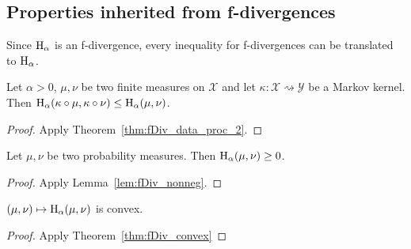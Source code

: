 \subsection{Properties inherited from f-divergences}

Since $\operatorname{H}_\alpha$ is an f-divergence, every inequality for f-divergences can be translated to $\operatorname{H}_\alpha$.

\begin{theorem}
  \label{thm:hellingerAlpha_data_proc}
  \leanok
  Let $\alpha > 0$, $\mu, \nu$ be two finite measures on $\mathcal X$ and let $\kappa : \mathcal X \rightsquigarrow \mathcal Y$ be a Markov kernel.
  Then $\operatorname{H}_\alpha(\kappa \circ \mu, \kappa \circ \nu) \le \operatorname{H}_\alpha(\mu, \nu)$.
\end{theorem}

\begin{proof} \leanok
{}
Apply Theorem~\ref{thm:fDiv_data_proc_2}.
\end{proof}

\begin{lemma}
  \label{lem:hellingerAlpha_nonneg}
  \leanok
  Let $\mu, \nu$ be two probability measures. Then $\operatorname{H}_\alpha(\mu, \nu) \ge 0$.
\end{lemma}

\begin{proof} \leanok
{}
Apply Lemma~\ref{lem:fDiv_nonneg}.
\end{proof}

\begin{lemma}
  \label{lem:hellingerAlpha_convex}
  $(\mu, \nu) \mapsto \operatorname{H}_\alpha(\mu, \nu)$ is convex.
\end{lemma}

\begin{proof}
Apply Theorem~\ref{thm:fDiv_convex}
\end{proof}
